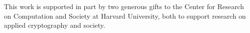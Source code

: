 \documentclass[sigconf, usenames, dvipsnames]{acmart}
\begin{document}
\begin{acks}
This work is supported in part by two generous gifts to the Center for Research on Computation and Society at Harvard University, both to support research on applied cryptography and society.
\end{acks}



\end{document}
